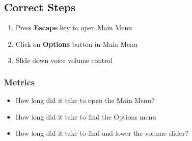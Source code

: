 \subsection{Correct Steps}
\begin{enumerate}
\item{Press \textbf{Escape} key to open Main Menu}
\item{Click on \textbf{Options} button in Main Menu}
\item{Slide down voice volume control}
\end{enumerate}

\subsubsection{Metrics}
\begin{itemize}
\item{How long did it take to open the Main Menu?}
\item{How long did it take to find the Options menu}
\item{How long did it take to find and lower the volume slider?}
\end{itemize}